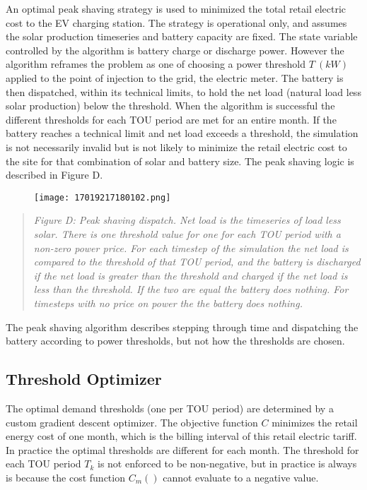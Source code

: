 \documentclass[
]{article}
\begin{document}
An optimal peak shaving strategy is used to minimized the total retail
electric cost to the EV charging station. The strategy is operational
only, and assumes the solar production timeseries and battery capacity
are fixed. The state variable controlled by the algorithm is battery
charge or discharge power. However the algorithm reframes the problem as
one of choosing a power threshold \(T\ (kW)\) applied to the point of
injection to the grid, the electric meter. The battery is then
dispatched, within its technical limits, to hold the net load (natural
load less solar production) below the threshold. When the algorithm is
successful the different thresholds for each TOU period are met for an
entire month. If the battery reaches a technical limit and net load
exceeds a threshold, the simulation is not necessarily invalid but is
not likely to minimize the retail electric cost to the site for that
combination of solar and battery size. The peak shaving logic is
described in Figure D.

\begin{figure}
\centering
\texttt{[image: 17019217180102.png]}
\caption{}
\end{figure}

\begin{quote}
\emph{Figure D: Peak shaving dispatch. Net load is the timeseries of
load less solar. There is one threshold value for one for each TOU
period with a non-zero power price. For each timestep of the simulation
the net load is compared to the threshold of that TOU period, and the
battery is discharged if the net load is greater than the threshold and
charged if the net load is less than the threshold. If the two are equal
the battery does nothing. For timesteps with no price on power the the
battery does nothing.}
\end{quote}

The peak shaving algorithm describes stepping through time and
dispatching the battery according to power thresholds, but not how the
thresholds are chosen.

\hypertarget{threshold-optimizer}{%
\subsection{Threshold Optimizer}\label{threshold-optimizer}}

The optimal demand thresholds (one per TOU period) are determined by a
custom gradient descent optimizer. The objective function \(C\)
minimizes the retail energy cost of one month, which is the billing
interval of this retail electric tariff. In practice the optimal
thresholds are different for each month. The threshold for each TOU
period \(T_k\) is not enforced to be non-negative, but in practice is
always is because the cost function \(C_m()\) cannot evaluate to a
negative value.
\end{document}
